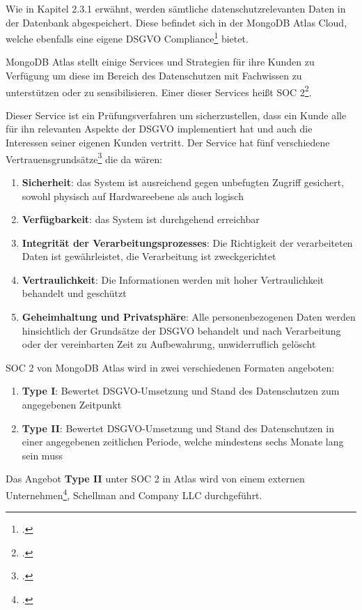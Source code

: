 Wie in Kapitel 2.3.1 erwähnt, werden sämtliche datenschutzrelevanten Daten in der Datenbank abgespeichert. Diese befindet sich in der MongoDB Atlas Cloud, welche ebenfalls eine eigene DSGVO Compliance\footcite{atlas-dsgvo-com} bietet.

MongoDB Atlas stellt einige Services und Strategien für ihre Kunden zu Verfügung um diese im Bereich des Datenschutzen mit Fachwissen zu unterstützen oder zu sensibilisieren. Einer dieser Services heißt SOC 2\footcite{atlas-soc2}.

Dieser Service ist ein Prüfungsverfahren um sicherzustellen, dass ein Kunde alle für ihn relevanten Aspekte der DSGVO implementiert hat und auch die Interessen seiner eigenen Kunden vertritt. Der Service hat fünf verschiedene
Vertrauensgrundsätze\footcite{atlas-soc2} die da wären:
\begin{enumerate}
	\item \textbf{Sicherheit}: das System ist ausreichend gegen unbefugten Zugriff gesichert, sowohl physisch auf Hardwareebene als auch logisch
	\item \textbf{Verfügbarkeit}: das System ist durchgehend erreichbar
	\item \textbf{Integrität der Verarbeitungsprozesses}: Die Richtigkeit der verarbeiteten Daten ist gewährleistet, die Verarbeitung ist zweckgerichtet
	\item \textbf{Vertraulichkeit}: Die Informationen werden mit hoher Vertraulichkeit behandelt und geschützt
	\item \textbf{Geheimhaltung und Privatsphäre}: Alle personenbezogenen Daten werden hinsichtlich der Grundsätze der DSGVO behandelt und nach Verarbeitung oder der vereinbarten Zeit zu Aufbewahrung, unwiderruflich gelöscht
\end{enumerate}
SOC 2 von MongoDB Atlas wird in zwei verschiedenen Formaten angeboten:
\begin{enumerate}
	\item \textbf{Type I}: Bewertet DSGVO-Umsetzung und Stand des Datenschutzen zum angegebenen Zeitpunkt 
	\item \textbf{Type II}: Bewertet DSGVO-Umsetzung und Stand des Datenschutzen in einer angegebenen zeitlichen Periode, welche mindestens sechs Monate lang sein muss
\end{enumerate}
Das Angebot \textbf{Type II} unter SOC 2 in Atlas wird von einem externen Unternehmen\footcite{atlas-soc2}, Schellman and Company LLC durchgeführt.
\newpage